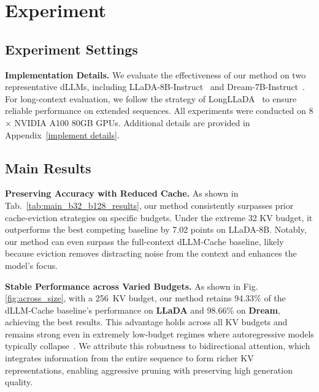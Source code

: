 \section{Experiment}
\subsection{Experiment Settings}

\noindent \textbf{Implementation Details.}
We evaluate the effectiveness of our method on two representative dLLMs, including LLaDA-8B-Instruct~\citep{nie2025large} and Dream-7B-Instruct~\citep{ye2025dream}.
For long-context evaluation, we follow the strategy of LongLLaDA~\citep{liu2025longllada} to ensure reliable performance on extended sequences.
All experiments were conducted on 8 × NVIDIA A100 80GB GPUs. Additional details are provided in Appendix~\ref{implement details}.

\subsection{Main Results}

\noindent \textbf{Preserving Accuracy with Reduced Cache.}
As shown in Tab.~\ref{tab:main_b32_b128_results}, our method consistently surpasses prior cache-eviction strategies on specific budgets. Under the extreme 32 KV budget, it outperforms the best competing baseline by 7.02 points on LLaDA-8B. Notably, our method can even surpass the full-context dLLM-Cache baseline, likely because eviction removes distracting noise from the context and enhances the model's focus.

\noindent \textbf{Stable Performance across Varied Budgets.}
As shown in Fig.\ref{fig:across_size}, with a 256~KV budget, our method retains 94.33\% of the dLLM‑Cache baseline's performance on \textbf{LLaDA} and 98.66\% on \textbf{Dream}, achieving the best results. This advantage holds across all KV budgets and remains strong even in extremely low‑budget regimes where autoregressive models typically collapse~\citep{xiao2023efficient}. We attribute this robustness to bidirectional attention, which integrates information from the entire sequence to form richer KV representations, enabling aggressive pruning with preserving high generation quality.

